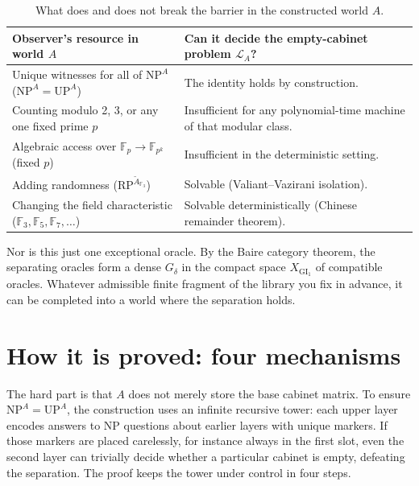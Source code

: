 \documentclass[11pt,a4paper]{article}
\newcommand{\F}{\mathbb F}
\newcommand{\NP}{\mathrm{NP}}
\newcommand{\UP}{\mathrm{UP}}
\newcommand{\LA}{\mathcal L_A}
\newcommand{\GI}{\mathrm{GI}_1}
\begin{document}
\begin{table}[htbp]\small\centering
\begin{tabularx}{\linewidth}{@{}>{\raggedright\arraybackslash}p{.47\linewidth} >{\raggedright\arraybackslash}X@{}}
\toprule Observer's resource in world \(A\) & Can it decide the empty-cabinet problem \(\LA\)?\\
\midrule Unique witnesses for all of \(\NP^A\) (\(\NP^A=\UP^A\)) & The identity holds by construction.\\
Counting modulo 2, 3, or any one fixed prime \(p\) & Insufficient for any polynomial-time machine of that modular class.\\
Algebraic access over \(\F_p\to\F_{p^k}\) (fixed \(p\)) & Insufficient in the deterministic setting.\\
Adding randomness (\(\mathrm{RP}^{\widetilde A_{\F_3}}\)) & Solvable (Valiant--Vazirani isolation).\\
Changing the field characteristic (\(\F_3,\F_5,\F_7,\ldots\)) & Solvable deterministically (Chinese remainder theorem).\\
\bottomrule
\end{tabularx}
\caption{What does and does not break the barrier in the constructed world \(A\).}
\end{table}

Nor is this just one exceptional oracle. By the Baire category theorem, the separating oracles form a dense \(G_\delta\) in the compact space \(X_{\GI}\) of compatible oracles. Whatever admissible finite fragment of the library you fix in advance, it can be completed into a world where the separation holds.



\section{How it is proved: four mechanisms}
The hard part is that \(A\) does not merely store the base cabinet matrix. To ensure \(\NP^A=\UP^A\), the construction uses an infinite recursive tower: each upper layer encodes answers to \(\NP\) questions about earlier layers with unique markers. If those markers are placed carelessly, for instance always in the first slot, even the second layer can trivially decide whether a particular cabinet is empty, defeating the separation. The proof keeps the tower under control in four steps.
\end{document}
